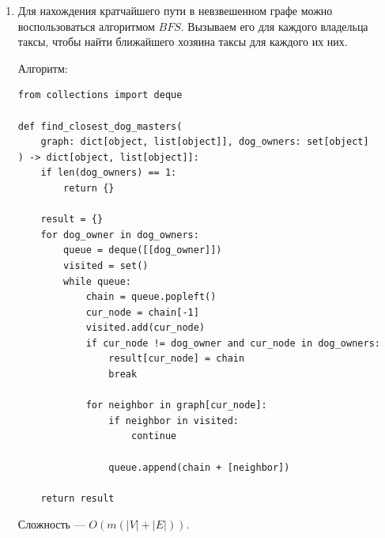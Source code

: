 \documentclass{article}
\begin{document}
\begin{enumerate}
\begin{lstlisting}
def get_lock_graph_diameter() -> int:
	graph = generate_lock_graph()
	visited = set()
	queue = deque([(0, "0000")])

	max_distance = 0
	while queue:
		distance, lock = queue.popleft()
		max_distance = max(max_distance, distance)
		visited.add(lock)

		for next_lock in graph[lock]:
			if next_lock in visited:
				continue
			queue.append((distance + 1, next_lock))

	return max_distance
	\end{lstlisting}
	      Сложность алгоритма --- $O(|V| + |E|)$.

	\item Для нахождения кратчайшего пути в невзвешенном графе
	      можно воспользоваться алгоритмом $BFS$. Вызываем его для
	      каждого владельца таксы, чтобы найти ближайшего хозяина таксы
	      для каждого их них.

	      Алгоритм:
	      \begin{lstlisting}
from collections import deque

def find_closest_dog_masters(
    graph: dict[object, list[object]], dog_owners: set[object]
) -> dict[object, list[object]]:
    if len(dog_owners) == 1:
        return {}
    
    result = {}
    for dog_owner in dog_owners:
        queue = deque([[dog_owner]])
        visited = set()
        while queue:
            chain = queue.popleft()
            cur_node = chain[-1]
            visited.add(cur_node)
            if cur_node != dog_owner and cur_node in dog_owners:
                result[cur_node] = chain
                break

            for neighbor in graph[cur_node]:
                if neighbor in visited:
                    continue

                queue.append(chain + [neighbor])

    return result
		  \end{lstlisting}
		  Сложность --- $O(m(|V| + |E|))$.
\end{enumerate}
\end{document}
